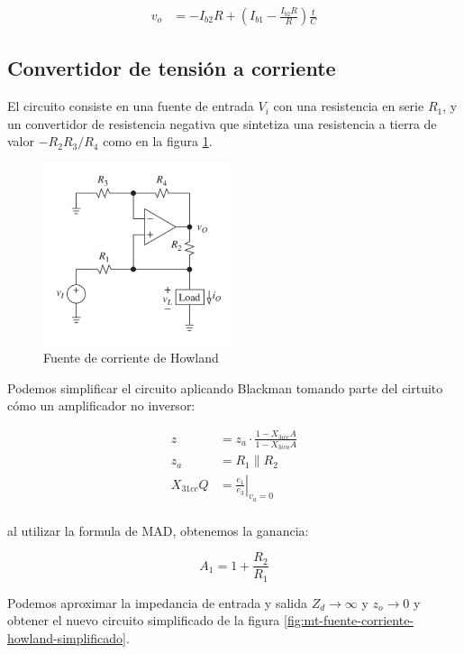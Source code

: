 \begin{align*}
v_o &= -I_{b2}R + \left( I_{b1} - \frac{I_{b2}R}{R} \right) \frac{t}{C}
\end{align*}

\subsection{Convertidor de tensión a corriente}

El circuito consiste en una fuente de entrada $V_i$ con una resistencia en serie $R_1$, y un convertidor de resistencia negativa que sintetiza una resistencia a tierra de valor $-R_2 R_3 / R_4$ como en la figura \ref{fig:mt-fuente-corriente-howland}.

\begin{figure}
    \centering
    \includegraphics[width=0.5\textwidth]{src/images/fuente-corriente-howland.png}
    \caption{Fuente de corriente de Howland}
    \label{fig:mt-fuente-corriente-howland}
\end{figure}

Podemos simplificar el circuito aplicando Blackman tomando parte del cirtuito cómo un amplificador no inversor:

\begin{align}
    z & = z_a \cdot \frac{1 - X_{3icc}A}{1 - X_{3ica}A} \\
    z_a & = R_1 \parallel R_2 \\
    X_{31cc} Q& = \left. \frac{e_1}{e_3} \right|_{v_a=0} \\
\end{align}

al utilizar la formula de MAD, obtenemos la ganancia:

\begin{equation}
    A_1 = 1 + \frac{R_2}{R_1}
\end{equation}

Podemos aproximar la impedancia de entrada y salida $Z_d \rightarrow \infty $ y $z_o \rightarrow 0$ y obtener el nuevo circuito simplificado de la figura \ref{fig:mt-fuente-corriente-howland-simplificado}.


